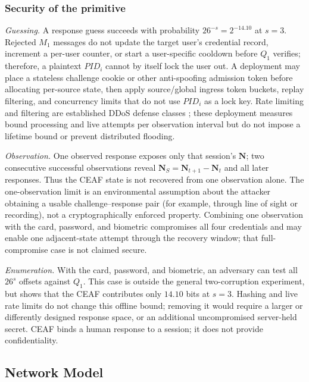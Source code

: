 \documentclass[cmc,article,submit,moreauthors,pdftex]{Definitions/tsp}
\begin{document}
\subsubsection{Security of the primitive}\label{sec:ceafsec}

\emph{Guessing.} A response guess succeeds with probability $26^{-s}=2^{-14.10}$ at $s=3$. Rejected $M_1$ messages do not update the target user's credential record, increment a per-user counter, or start a user-specific cooldown before $Q_1$ verifies; therefore, a plaintext $PID_i$ cannot by itself lock the user out. A deployment may place a stateless challenge cookie or other anti-spoofing admission token before allocating per-source state, then apply source/global ingress token buckets, replay filtering, and concurrency limits that do not use $PID_i$ as a lock key. Rate limiting and filtering are established DDoS defense classes \cite{mirkovic2004taxonomy}; these deployment measures bound processing and live attempts per observation interval but do not impose a lifetime bound or prevent distributed flooding.

\emph{Observation.} One observed response exposes only that session's $\mathbf{N}$; two consecutive successful observations reveal $\mathbf{N}_S=\mathbf{N}_{t+1}-\mathbf{N}_t$ and all later responses. Thus the CEAF state is not recovered from one observation alone. The one-observation limit is an environmental assumption about the attacker obtaining a usable challenge--response pair (for example, through line of sight or recording), not a cryptographically enforced property. Combining one observation with the card, password, and biometric compromises all four credentials and may enable one adjacent-state attempt through the recovery window; that full-compromise case is not claimed secure.

\emph{Enumeration.} With the card, password, and biometric, an adversary can test all $26^s$ offsets against $Q_1$. This case is outside the general two-corruption experiment, but shows that the CEAF contributes only $14.10$ bits at $s=3$. Hashing and live rate limits do not change this offline bound; removing it would require a larger or differently designed response space, or an additional uncompromised server-held secret. CEAF binds a human response to a session; it does not provide confidentiality.

\subsection{Network Model}\label{sec:netmodel}
\end{document}
